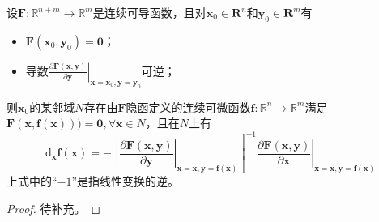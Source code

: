 \documentclass[main.tex]{subfiles}
\begin{document}
\begin{theorem}[隐函数定理]\label{thm:II.4.13}
    设$\mathbf{F}:\mathbb{R}^{n+m}\rightarrow\mathbb{R}^m$是连续可导函数，且对$\mathbf{x}_0\in\mathbf{R}^n$和$\mathbf{y}_0\in\mathbf{R}^m$有
    \begin{itemize}
        \item $\mathbf{F}\left(\mathbf{x}_0,\mathbf{y}_0\right)=\mathbf{0}$；
        \item 导数$\left.\frac{\partial \mathbf{F}\left(\mathbf{x},\mathbf{y}\right)}{\partial \mathbf{y}}\right|_{\mathbf{x}=\mathbf{x}_0,\mathbf{y}=\mathbf{y}_0}$可逆；
    \end{itemize}
    则$\mathbf{x}_0$的某邻域$N$存在由$\mathbf{F}$隐函定义的连续可微函数$\mathbf{f}:\mathbb{R}^n\rightarrow\mathbb{R}^m$满足$\mathbf{F}\left(\mathbf{x},\mathbf{f}\left(\mathbf{x}\right)\right))=\mathbf{0},\forall\mathbf{x}\in N$，且在$N$上有
    \[\mathrm{d}_{\mathbf{x}}\mathbf{f}\left(\mathbf{x}\right)=-\left[\left.\frac{\partial\mathbf{F}\left(\mathbf{x},\mathbf{y}\right)}{\partial\mathbf{y}}\right|_{\mathbf{x}=\mathbf{x},\mathbf{y}=\mathbf{f}\left(\mathbf{x}\right)}\right]^{-1}\left.\frac{\partial\mathbf{F}\left(\mathbf{x},\mathbf{y}\right)}{\partial\mathbf{x}}\right|_{\mathbf{x}=\mathbf{x},\mathbf{y}=\mathbf{f}\left(\mathbf{x}\right)}\]
    上式中的“$-1$”是指线性变换的逆。
\end{theorem}
\begin{proof}
    待补充\cite[p.~593]{Williamson1972}。
\end{proof}
\end{document}
